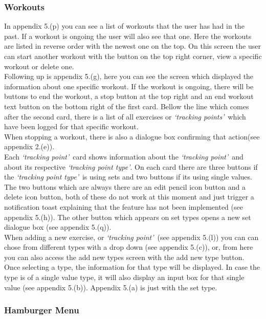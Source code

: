 \documentclass{article}
\newcommand{\vspaceconst}{-2ex}
\newcommand{\tpt}{\textit{`tracking point type'}}
\newcommand{\tp}{\textit{`tracking point'}}
\newcommand{\tps}{\textit{`tracking points'}}
\begin{document}
\begin{multicols}{2}
\subsubsection{Workouts}
\vspace{\vspaceconst}

In appendix 5.(p) you can see a list of workouts that the user has had in the past. If a workout is ongoing the user will also see that one. Here the workouts are listed in reverse order with the newest one on the top. On this screen the user can start another workout with the button on the top right corner, view a specific workout or delete one.\\
Following up is appendix 5.(g), here you can see the screen which displayed the information about one specific workout. If the workout is ongoing, there will be buttons to end the workout, a stop button at the top right and an end workout text button on the bottom right of the first card. Bellow the line which comes after the second card, there is a list of all exercises or \tps~which have been logged for that specific workout.\\
When stopping a workout, there is also a dialogue box confirming that action(see appendix 2.(e)).\\
Each \tp~card shows information about the \tp~and about its respective \tpt. On each card there are three buttons if the \tpt~is using sets and two buttons if its using single values. The two buttons which are always there are an edit pencil icon button and a delete icon button, both of these do not work at this moment and just trigger a notification toast explaining that the feature has not been implemented (see appendix 5.(h)). The other button which appears on set types opens a new set dialogue box (see appendix 5.(q)).\\
When adding a new exercise, or \tp~(see appendix 5.(l)) you can can chose from different types with a drop down (see appendix 5.(c)), or, from here you can also access the add new types screen with the add new type button. Once selecting a type, the information for that type will be displayed. In case the type is of a single value type, it will also display an input box for that single value (see appendix 5.(b)). Appendix 5.(a) is just with the set type.\\


\subsubsection{Hamburger Menu}
\vspace{\vspaceconst}


\end{multicols}
\end{document}
